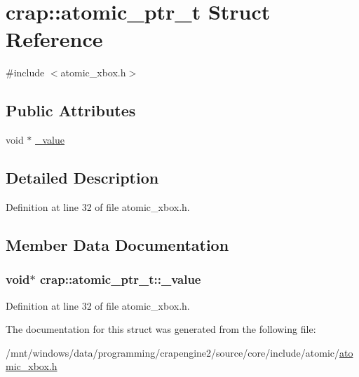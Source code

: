 \hypertarget{structcrap_1_1atomic__ptr__t}{\section{crap\+:\+:atomic\+\_\+ptr\+\_\+t Struct Reference}
\label{structcrap_1_1atomic__ptr__t}
}


{\ttfamily \#include $<$atomic\+\_\+xbox.\+h$>$}

\subsection*{Public Attributes}
\begin{DoxyCompactItemize}
\item 
void $\ast$ \hyperlink{structcrap_1_1atomic__ptr__t_aaadad78152d53398555fb40cc7276d72}{\+\_\+value}
\end{DoxyCompactItemize}


\subsection{Detailed Description}


Definition at line 32 of file atomic\+\_\+xbox.\+h.



\subsection{Member Data Documentation}
\hypertarget{structcrap_1_1atomic__ptr__t_aaadad78152d53398555fb40cc7276d72}{
\subsubsection[{\+\_\+value}]{\setlength{\rightskip}{0pt plus 5cm}void$\ast$ crap\+::atomic\+\_\+ptr\+\_\+t\+::\+\_\+value}}\label{structcrap_1_1atomic__ptr__t_aaadad78152d53398555fb40cc7276d72}


Definition at line 32 of file atomic\+\_\+xbox.\+h.



The documentation for this struct was generated from the following file\+:\begin{DoxyCompactItemize}
\item 
/mnt/windows/data/programming/crapengine2/source/core/include/atomic/\hyperlink{atomic__xbox_8h}{atomic\+\_\+xbox.\+h}\end{DoxyCompactItemize}

